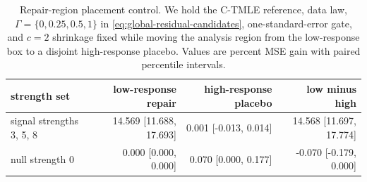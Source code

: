 \begin{table}[t]
\centering
\small
\caption{Repair-region placement control.  We hold the C-TMLE reference, data law, \(\Gamma=\{0,0.25,0.5,1\}\) in \eqref{eq:global-residual-candidates}, one-standard-error gate, and \(c=2\) shrinkage fixed while moving the analysis region from the low-response box to a disjoint high-response placebo. Values are percent MSE gain with paired percentile intervals.}
\label{tab:low-high-response-ablation}
\begin{tabular}{@{}lrrr@{}}
\toprule
strength set & low-response repair & high-response placebo & low minus high \\
\midrule
signal strengths 3, 5, 8 & 14.569 [11.688, 17.693] & 0.001 [-0.013, 0.014] & 14.568 [11.697, 17.774] \\
null strength 0 & 0.000 [0.000, 0.000] & 0.070 [0.000, 0.177] & -0.070 [-0.179, 0.000] \\
\bottomrule
\end{tabular}
\end{table}
